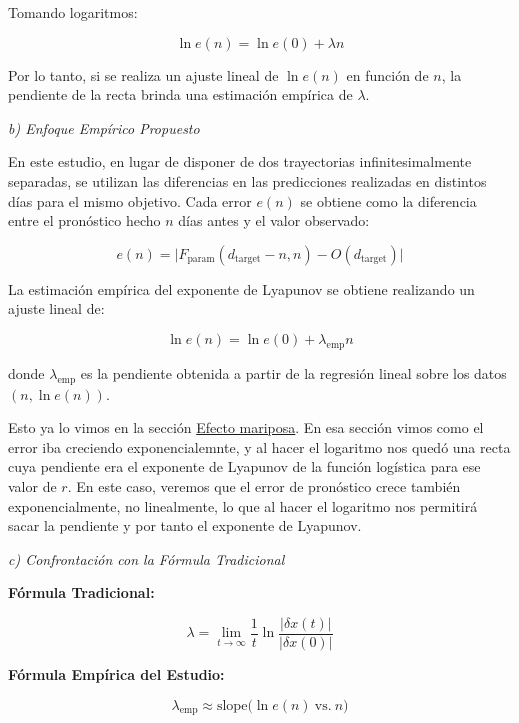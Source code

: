 \documentclass[
  10pt,
  a4paper,
  DIV=11,
  numbers=noendperiod,
  open=any]{scrreprt}
\numberwithin{equation}{chapter}
\numberwithin{equation}{section}
\renewcommand{\[}{\begin{equation}}
\renewcommand{\]}{\end{equation}}
\begin{document}
Tomando logaritmos:

\begin{equation}
\ln e(n) = \ln e(0) + \lambda n
\end{equation}

Por lo tanto, si se realiza un ajuste lineal de \(\ln e(n)\) en función
de \(n\), la pendiente de la recta brinda una estimación empírica de
\(\lambda\).

\emph{b) Enfoque Empírico Propuesto}

En este estudio, en lugar de disponer de dos trayectorias
infinitesimalmente separadas, se utilizan las diferencias en las
predicciones realizadas en distintos días para el mismo objetivo. Cada
error \(e(n)\) se obtiene como la diferencia entre el pronóstico hecho
\(n\) días antes y el valor observado:

\begin{equation}
e(n) = \bigl| F_{\text{param}}(d_{\text{target}}-n, n) - O(d_{\text{target}}) \bigr|
\end{equation}

La estimación empírica del exponente de Lyapunov se obtiene realizando
un ajuste lineal de:

\begin{equation}
\ln e(n) = \ln e(0) + \lambda_{\text{emp}} n
\end{equation}

donde \(\lambda_{\text{emp}}\) es la pendiente obtenida a partir de la
regresión lineal sobre los datos \((n, \ln e(n))\).

Esto ya lo vimos en la sección \hyperref[sec-sensibilidad]{Efecto
mariposa}. En esa sección vimos como el error iba creciendo
exponencialemnte, y al hacer el logaritmo nos quedó una recta cuya
pendiente era el exponente de Lyapunov de la función logística para ese
valor de \(r\). En este caso, veremos que el error de pronóstico crece
también exponencialmente, no linealmente, lo que al hacer el logaritmo
nos permitirá sacar la pendiente y por tanto el exponente de Lyapunov.

\emph{c) Confrontación con la Fórmula Tradicional}

\textbf{Fórmula Tradicional:}

\begin{equation}
\lambda = \lim_{t \to \infty} \frac{1}{t} \ln \frac{|\delta x(t)|}{|\delta x(0)|}
\end{equation}

\textbf{Fórmula Empírica del Estudio:}

\begin{equation}
\lambda_{\text{emp}} \approx \text{slope}\bigl(\ln e(n)\ \text{vs.}\ n\bigr)
\end{equation}
\end{document}
